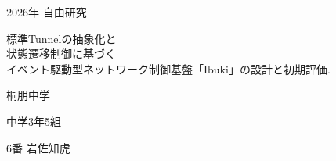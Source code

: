\documentclass[11pt,a4paper,twoside]{ltjsarticle}
\begin{document}
\begin{titlepage}
\begin{center}

\thispagestyle{empty}
{\Large 2026年}
\vspace{10truept}
{\Large 自由研究}

\vspace*{180truept}
{\Huge 標準Tunnelの抽象化と\\状態遷移制御に基づく\\イベント駆動型ネットワーク制御基盤「Ibuki」の設計と初期評価.} 

\vspace{160truept}
\vspace{70truept}
{\Large 桐朋中学}

\vspace{10truept}
{\Large 中学3年5組}

\vspace{10truept}
{\Large 6番 岩佐知虎}	
\end{center}	
\end{titlepage}
\cleardoublepage
\end{document}
